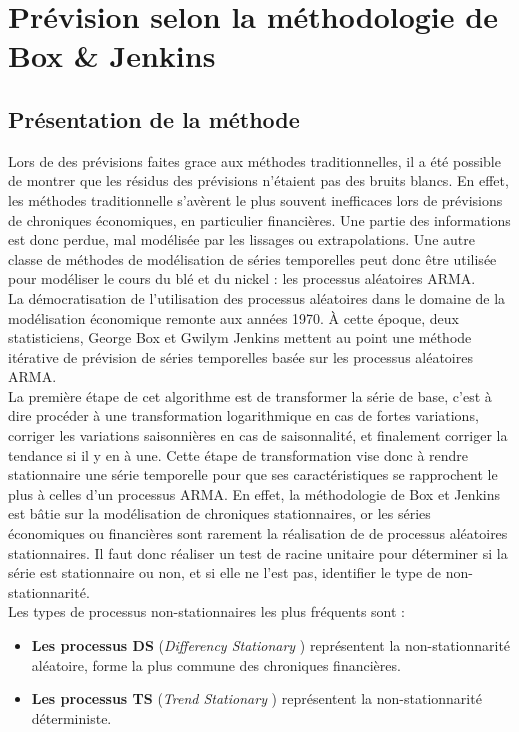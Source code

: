 \section{Prévision selon la méthodologie de Box \& Jenkins}\label{sec:bj}
\subsection{Présentation de la méthode}
Lors de des prévisions faites grace aux méthodes traditionnelles, il a été possible de montrer que les résidus des prévisions n'étaient pas des bruits blancs. En effet, 
les méthodes traditionnelle s'avèrent le plus souvent inefficaces lors de prévisions de chroniques économiques, en particulier financières. Une partie des informations est 
donc perdue, mal modélisée par les lissages ou extrapolations. Une autre classe de méthodes de modélisation de séries temporelles peut donc être utilisée pour modéliser le 
cours du blé et du nickel : les processus aléatoires ARMA.\\[11pt]
La démocratisation de l'utilisation des processus aléatoires dans le domaine de la modélisation économique remonte aux années 1970. À cette époque, deux statisticiens, 
George Box et Gwilym Jenkins mettent au point une méthode itérative de prévision de séries temporelles basée sur les processus aléatoires ARMA. \\[11pt]
La première étape de cet algorithme est de transformer la série de base, c'est à dire procéder à une transformation logarithmique en cas de fortes variations, corriger les 
variations saisonnières en cas de saisonnalité, et finalement corriger la tendance si il y en à une. Cette étape de transformation vise donc à rendre stationnaire une 
série temporelle pour que ses caractéristiques se rapprochent le plus à celles d'un processus ARMA. En effet, la méthodologie de Box et Jenkins est bâtie sur la 
modélisation de chroniques stationnaires, or les séries économiques ou financières sont rarement la réalisation de de processus aléatoires stationnaires. Il faut donc 
réaliser un test de racine unitaire pour déterminer si la série est stationnaire ou non, et si elle ne l'est pas, identifier le type de non-stationnarité.\\[11pt]
Les types de processus non-stationnaires les plus fréquents sont :
\begin{itemize}
    \item \textbf{Les processus DS}  (\textit{Differency Stationary} ) représentent la non-stationnarité aléatoire, forme la plus commune des chroniques financières.
    \item \textbf{Les processus TS}  (\textit{Trend Stationary} ) représentent la non-stationnarité déterministe.
\end{itemize}
